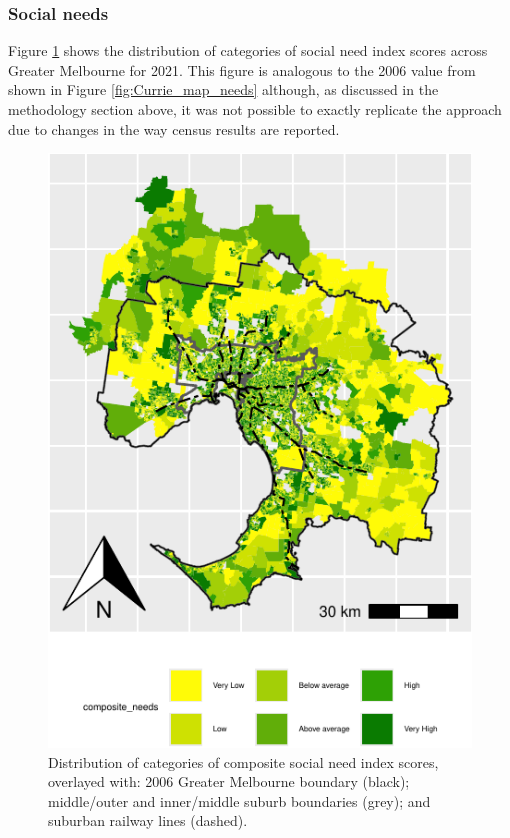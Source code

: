 \documentclass[preprint, 3p,
authoryear]{elsarticle} %
\begin{document}
\subsubsection{Social needs}\label{social-needs}

Figure \ref{fig:Greater_Melbourne_2021_social_needs} shows the
distribution of categories of social need index scores across Greater
Melbourne for 2021. This figure is analogous to the 2006 value from
\citet{currie2010identifying} shown in Figure \ref{fig:Currie_map_needs}
although, as discussed in the methodology section above, it was not
possible to exactly replicate the \citet{currie2010identifying} approach
due to changes in the way census results are reported.

\begin{figure}
\includegraphics[width=0.9\linewidth]{Leveraging_GTFS_to_assess_transit_supply_Transport_Geography_files/figure-latex/Greater_Melbourne_2021_social_needs-1} \caption{Distribution of categories of composite social need index scores, overlayed with: 2006 Greater Melbourne boundary (black); middle/outer and inner/middle suburb boundaries (grey); and suburban railway lines (dashed).}\label{fig:Greater_Melbourne_2021_social_needs}
\end{figure}
\end{document}
